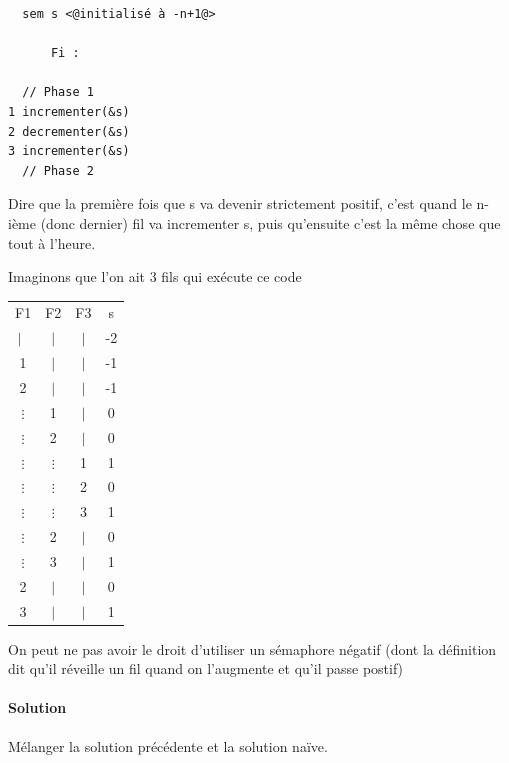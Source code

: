 \begin{minipage}{0.5\linewidth}
\begin{lstlisting}
  sem s <@initialisé à -n+1@>

      Fi :

  // Phase 1
1 incrementer(&s)
2 decrementer(&s)
3 incrementer(&s)
  // Phase 2
\end{lstlisting}
\end{minipage} \enspace
\begin{minipage}{0.45\linewidth}
	\begin{com}
		Dire que la première fois que s va devenir strictement positif, c'est quand le n-ième (donc dernier) fil va incrementer s, puis qu'ensuite c'est la même chose que tout à l'heure.
	\end{com}
\end{minipage}

\begin{example}
	Imaginons que l'on ait 3 fils qui exécute ce code
	\begin{center}
		\begin{tabular}{c|c|c|c}
			F1 & F2 & F3 & s\\
			$|$ & $|$ & $|$ & -2\\
			1 & $|$ & $|$ & -1\\
			2 & $|$ & $|$ & -1\\
			$\vdots$ & 1 & $|$ & 0\\
			$\vdots$ & 2 & $|$ & 0\\
			$\vdots$ & $\vdots$ & 1 & 1\\
			$\vdots$ & $\vdots$ & 2 & 0\\
			$\vdots$ & $\vdots$ & 3 & 1\\
			$\vdots$ & 2 & $|$ & 0\\
			$\vdots$ & 3 & $|$ & 1\\
			2 & $|$ & $|$ & 0\\
			3 & $|$ & $|$ & 1\\
			
		\end{tabular}
	\end{center}
\end{example}

\begin{rem}
	On peut ne pas avoir le droit d'utiliser un sémaphore négatif (dont la définition dit qu'il réveille un fil quand on l'augmente et qu'il passe postif)
\end{rem}

\paragraph{Solution} Mélanger la solution précédente et la solution naïve.

